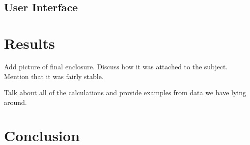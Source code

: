 \documentclass[conference]{IEEEtran}
\begin{document}
\subsection{User Interface}

\section{Results}
Add picture of final enclosure. Discuss how it was attached to the subject. Mention that
it was fairly stable.

Talk about all of the calculations and provide examples from data we have lying around. 

\section{Conclusion} 


\balance

\end{document}

